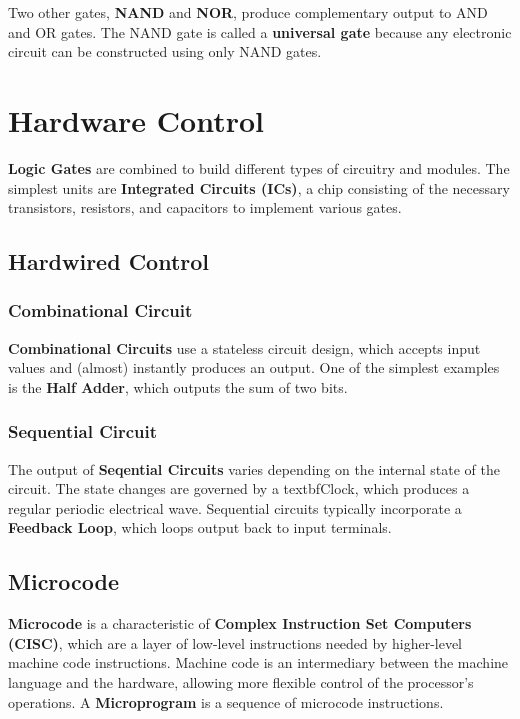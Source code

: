 \documentclass[pdftex,10pt]{article}
\begin{document}
Two other gates, \textbf{NAND} and \textbf{NOR}, produce complementary output to AND and OR gates. The NAND gate is called a \textbf{universal gate} because any electronic circuit can be constructed using only NAND gates.

\section{Hardware Control}

\textbf{Logic Gates} are combined to build different types of circuitry and modules. The simplest units are \textbf{Integrated Circuits (ICs)}, a chip consisting of the necessary transistors, resistors, and capacitors to implement various gates.

\subsection{Hardwired Control}
\subsubsection{Combinational Circuit}

\textbf{Combinational Circuits} use a stateless circuit design, which accepts input values and (almost) instantly produces an output. One of the simplest examples is the \textbf{Half Adder}, which outputs the sum of two bits.

\subsubsection{Sequential Circuit}

The output of \textbf{Seqential Circuits} varies depending on the internal state of the circuit. The state changes are governed by a textbf{Clock}, which produces a regular periodic electrical wave. Sequential circuits typically incorporate a \textbf{Feedback Loop}, which loops output back to input terminals.

\subsection{Microcode}

\textbf{Microcode} is a characteristic of \textbf{Complex Instruction Set Computers (CISC)}, which are a layer of low-level instructions needed by higher-level machine code instructions. Machine code is an intermediary between the machine language and the hardware, allowing more flexible control of the processor's operations. A \textbf{Microprogram} is a sequence of microcode instructions.
\end{document}
